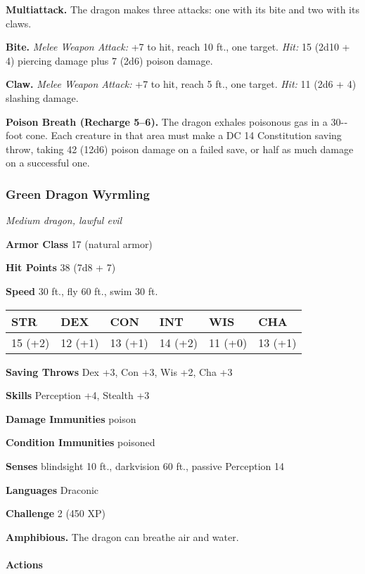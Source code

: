 \documentclass[
]{article}
\begin{document}
\textbf{Multiattack.} The dragon makes three attacks: one with its bite
and two with its claws.

\textbf{Bite.} \emph{Melee Weapon Attack:} +7 to hit, reach 10 ft., one
target. \emph{Hit:} 15 (2d10 + 4) piercing damage plus 7 (2d6) poison
damage.

\textbf{Claw.} \emph{Melee Weapon Attack:} +7 to hit, reach 5 ft., one
target. \emph{Hit:} 11 (2d6 + 4) slashing damage.

\textbf{Poison Breath (Recharge 5--6).} The dragon exhales poisonous gas
in a 30-­‐foot cone. Each creature in that area must make a DC 14
Constitution saving throw, taking 42 (12d6) poison damage on a failed
save, or half as much damage on a successful one.

\hypertarget{green-dragon-wyrmling}{%
\subsubsection{Green Dragon Wyrmling}\label{green-dragon-wyrmling}}

\emph{Medium dragon, lawful evil}

\textbf{Armor Class} 17 (natural armor)

\textbf{Hit Points} 38 (7d8 + 7)

\textbf{Speed} 30 ft., fly 60 ft., swim 30 ft.

\begin{longtable}[]{@{}llllll@{}}
\toprule
STR & DEX & CON & INT & WIS & CHA\tabularnewline
\midrule
\endhead
15 (+2) & 12 (+1) & 13 (+1) & 14 (+2) & 11 (+0) & 13 (+1)\tabularnewline
\bottomrule
\end{longtable}

\textbf{Saving Throws} Dex +3, Con +3, Wis +2, Cha +3

\textbf{Skills} Perception +4, Stealth +3

\textbf{Damage Immunities} poison

\textbf{Condition Immunities} poisoned

\textbf{Senses} blindsight 10 ft., darkvision 60 ft., passive Perception
14

\textbf{Languages} Draconic

\textbf{Challenge} 2 (450 XP)

\textbf{Amphibious.} The dragon can breathe air and water.

\hypertarget{actions-34}{%
\paragraph{Actions}\label{actions-34}}
\end{document}
